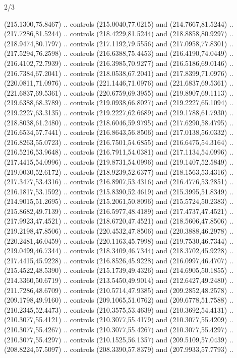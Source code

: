 \begin{flagdescription}{2/3}
\begin{scope}[xshift=0.5\flaglength,yshift=0.5\flagwidth,scale=\flagwidth/180]
\begin{scope}[y=0.8pt, x=0.8pt, yscale=-1,shift={(-168.75,-108.75)}]
  (215.1300,75.8467) .. controls (215.0040,77.0215) and (214.7667,81.5244) ..
  (217.7286,81.5244) .. controls (218.4229,81.5244) and (218.8858,80.9297) ..
  (218.9474,80.1797) .. controls (217.1192,79.5556) and (217.0958,77.8301) ..
  (217.5294,76.2598) .. controls (216.6388,75.4453) and (216.4190,74.0449) ..
  (216.4102,72.7939) .. controls (216.3985,70.9277) and (216.5186,69.0146) ..
  (216.7384,67.2041) .. controls (218.0538,67.2041) and (217.8399,71.0976) ..
  (220.0811,71.0976) .. controls (221.1446,71.0976) and (221.6837,69.5361) ..
  (221.6837,69.5361) .. controls (220.6759,69.3955) and (219.8907,69.1113) ..
  (219.6388,68.3789) .. controls (219.0938,66.8027) and (219.2227,65.1094) ..
  (219.2227,63.3135) .. controls (219.2227,62.6689) and (219.1788,61.7930) ..
  (218.8038,61.2480) .. controls (218.6046,59.9795) and (217.6290,58.4795) ..
  (216.6534,57.7441) .. controls (216.8643,56.8506) and (217.0138,56.0332) ..
  (216.8263,55.0723) .. controls (216.7501,54.6855) and (216.6475,54.3164) ..
  (216.5216,53.9648) .. controls (216.7911,54.0381) and (217.1134,54.0996) ..
  (217.4415,54.0996) .. controls (219.8731,54.0996) and (219.1407,52.5849) ..
  (219.0030,52.6172) .. controls (218.9239,52.6377) and (218.1563,53.4316) ..
  (217.3477,53.4316) .. controls (216.8907,53.4316) and (216.4776,53.2851) ..
  (216.1817,53.1592) .. controls (215.8390,52.4619) and (215.3995,51.8349) ..
  (214.9015,51.2695) .. controls (215.2061,50.8096) and (215.5724,50.2383) ..
  (215.8682,49.7139) .. controls (216.5977,48.4189) and (217.4737,47.4521) ..
  (217.9923,47.4521) .. controls (218.6720,47.4521) and (218.5606,47.8506) ..
  (219.2198,47.8506) .. controls (220.4532,47.8506) and (220.3888,46.2978) ..
  (220.2481,46.0459) .. controls (220.1163,45.7998) and (219.7530,46.7344) ..
  (219.0499,46.7344) .. controls (218.3409,46.7344) and (218.3702,45.9228) ..
  (217.4415,45.9228) .. controls (216.8526,45.9228) and (216.0997,46.4707) ..
  (215.4522,48.5390) .. controls (215.1739,49.4326) and (214.6905,50.1855) ..
  (214.3360,50.6719) .. controls (213.5450,49.9014) and (212.6427,49.2480) ..
  (211.7286,48.6709) .. controls (210.5714,47.9385) and (209.2852,48.2578) ..
  (209.1798,49.9160) .. controls (209.1065,51.0762) and (209.6778,51.7588) ..
  (210.2345,52.4473) .. controls (210.3575,53.4639) and (210.3692,54.4131) ..
  (210.3077,55.4121) .. controls (210.3077,55.4179) and (210.3077,55.4209) ..
  (210.3077,55.4267) .. controls (210.3077,55.4267) and (210.3077,55.4297) ..
  (210.3077,55.4297) .. controls (210.1525,56.1357) and (209.5109,57.0439) ..
  (208.8224,57.5097) .. controls (208.3390,57.8379) and (207.9933,57.7793) ..

\end{scope}
\end{scope}
\end{flagdescription}
